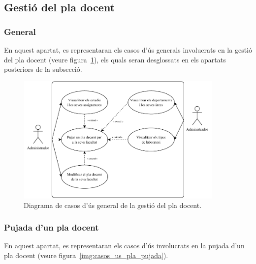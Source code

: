 \documentclass[a4paper,12pt]{ThesisStyle}
\begin{document}
\newpage

\subsection{Gestió del pla docent}
\label{subsec:casos_us_pla}

\subsubsection{General}

En aquest apartat, es representaran els casos d'ús generals involucrats en la gestió del pla docent (veure figura~\ref{img:casos_us_pla_general}), els quals seran desglossats en els apartats posteriors de la subsecció.

\begin{figure}[H]
  \centering
  \includegraphics[width=0.9\textwidth]{assets/use_cases/pla_docent/general.pdf}
  \caption{\label{img:casos_us_pla_general}Diagrama de casos d'ús general de la gestió del pla docent.}
\end{figure}

\newpage

\subsubsection{Pujada d'un pla docent}

En aquest apartat, es representaran els casos d'ús involucrats en la pujada d'un pla docent (veure figura~\ref{img:casos_us_pla_pujada}).
\end{document}
